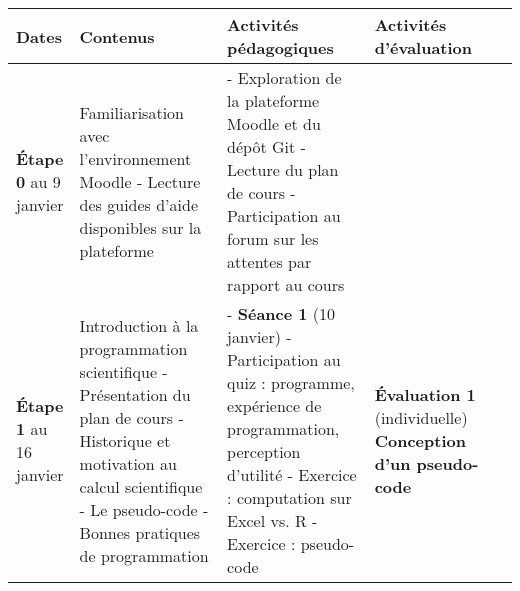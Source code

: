 \documentclass[12]{article}
\begin{document}
	\begin{center}
        \begin{tabular}{| p{0.1\linewidth} | p{0.3\linewidth} | p{0.3\linewidth} | p{0.3\linewidth} | } 
        \hline
        Dates & Contenus & Activités pédagogiques & Activités d'évaluation \\ [0.5ex] 
        \hline\hline
        \textbf{Étape 0} \linebreak 5 au 9 janvier & 
        Familiarisation avec l'environnement Moodle\hfill\hfill \linebreak\linebreak 
        	- Lecture des guides d’aide disponibles sur la plateforme\hfill\hfill &
        - Exploration de la plateforme Moodle et du dépôt Git\hfill\hfill \linebreak
        - Lecture du plan de cours\hfill\hfill \linebreak
        - Participation au forum sur les attentes par rapport au cours\hfill\hfill & 
         \\
         \hline
         \textbf{Étape 1} \linebreak 10 au 16 janvier & 
        Introduction à la programmation scientifique\hfill\hfill \linebreak\linebreak
            - Présentation du plan de cours\hfill \linebreak
			- Historique et motivation au calcul scientifique\hfill\hfill \linebreak
        	- Le pseudo-code\hfill\hfill \linebreak
    		- Bonnes pratiques de programmation\hfill\hfill & 
        - \textbf{Séance 1} (10 janvier)\hfill\hfill \linebreak
        - Participation au quiz : programme, expérience de programmation, perception d'utilité\hfill\hfill\hfill \linebreak
        - Exercice : computation sur Excel vs. R\hfill\hfill\hfill \linebreak
        - Exercice : pseudo-code\hfill\hfill\hfill \linebreak & 
        \textbf{Évaluation 1} (individuelle) \linebreak
        \textbf{Conception d'un pseudo-code}\hfill\hfill \linebreak

\end{tabular}
\end{center}
\end{document}
